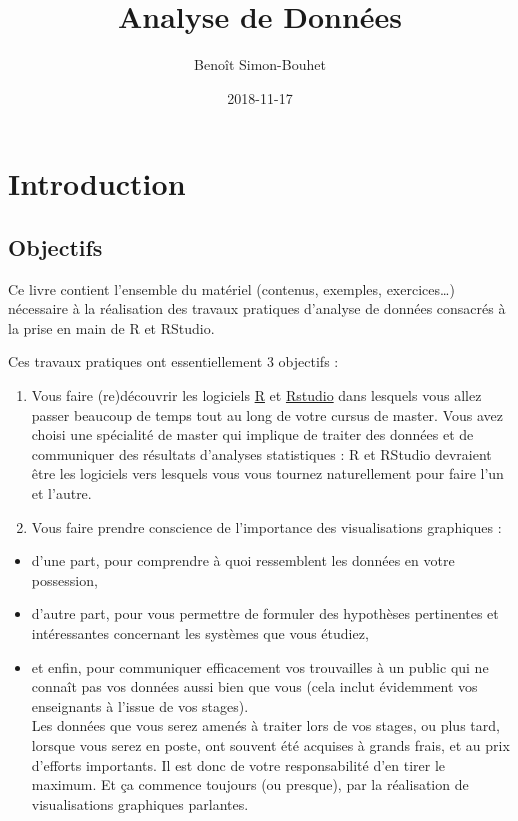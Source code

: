 \documentclass[a4paperpaper,]{article}
\title{Analyse de Données}
\author{Benoît Simon-Bouhet}
\date{2018-11-17}
\providecommand{\tightlist}{%
  \setlength{\itemsep}{0pt}\setlength{\parskip}{0pt}}
\theoremstyle{definition}
\theoremstyle{definition}
\theoremstyle{definition}
\theoremstyle{remark}
\begin{document}
\maketitle

{
\setcounter{tocdepth}{2}
\tableofcontents
}
\hypertarget{introduction}{%
\section{Introduction}\label{introduction}}

\hypertarget{objectifs}{%
\subsection{Objectifs}\label{objectifs}}

Ce livre contient l'ensemble du matériel (contenus, exemples,
exercices\ldots{}) nécessaire à la réalisation des travaux pratiques
d'analyse de données consacrés à la prise en main de R et RStudio.

Ces travaux pratiques ont essentiellement 3 objectifs :

\begin{enumerate}
\def\labelenumi{\arabic{enumi}.}
\tightlist
\item
  Vous faire (re)découvrir les logiciels
  \href{https://cran.r-project.org}{R} et
  \href{https://www.rstudio.com}{Rstudio} dans lesquels vous allez
  passer beaucoup de temps tout au long de votre cursus de master. Vous
  avez choisi une spécialité de master qui implique de traiter des
  données et de communiquer des résultats d'analyses statistiques : R et
  RStudio devraient être les logiciels vers lesquels vous vous tournez
  naturellement pour faire l'un et l'autre.
\item
  Vous faire prendre conscience de l'importance des visualisations
  graphiques :
\end{enumerate}

\begin{itemize}
\tightlist
\item
  d'une part, pour comprendre à quoi ressemblent les données en votre
  possession,
\item
  d'autre part, pour vous permettre de formuler des hypothèses
  pertinentes et intéressantes concernant les systèmes que vous étudiez,
\item
  et enfin, pour communiquer efficacement vos trouvailles à un public
  qui ne connaît pas vos données aussi bien que vous (cela inclut
  évidemment vos enseignants à l'issue de vos stages).\\
  Les données que vous serez amenés à traiter lors de vos stages, ou
  plus tard, lorsque vous serez en poste, ont souvent été acquises à
  grands frais, et au prix d'efforts importants. Il est donc de votre
  responsabilité d'en tirer le maximum. Et ça commence toujours (ou
  presque), par la réalisation de visualisations graphiques parlantes.
\end{itemize}
\end{document}
